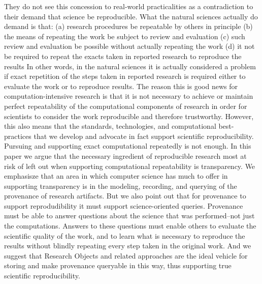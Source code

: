 They do not see this concession to real-world practicalities as a contradiction to their demand that science be reproducible.
What the natural sciences actually do demand is that:
	(a) research procedures be repeatable by others in principle
	(b) the means of repeating the work be subject to review and evaluation
	(c) such review and evaluation be possible without actually repeating the work
	(d) it not be required to repeat the exacts taken in reported research to reproduce the results
In other words, in the natural sciences it is actually considered a problem if exact repetition of the steps taken in reported research
	is required either to evaluate the work or to reproduce results.
The reason this is good news for computation-intensive research is that it is not necessary to achieve or maintain perfect repeatability
	of the computational components of research in order for scientists to consider the work reproducible and therefore trustworthy.
However, this also means that the standards, technologies, and computational best-practices that we develop and advocate
	in fact support scientific reproducibility. Pursuing and supporting exact computational repeatedly is not enough.
In this paper we argue that the necessary ingredient of reproducible research most at risk of left out when supporting computational
	repeatability is transparency.
We emphasisze that an area in which computer science has much to offer in supporting transparency is in the modeling, recording, 
	and querying of the provenance of research artifacts.
But we also point out that for provenance to support reprodudibility it must support science-oriented queries.
Provenance must be able to answer questions about the science that was performed--not just the computations.
Answers to these questions must enable others to evaluate the scientific quality of the work, and to learn what is necessary to 
	reproduce the results without blindly repeating every step taken in the original work.
And we suggest that Research Objects and related approaches are the ideal vehicle for storing and make provenance queryable
	in this way, thus supporting true scientific reproducibility.